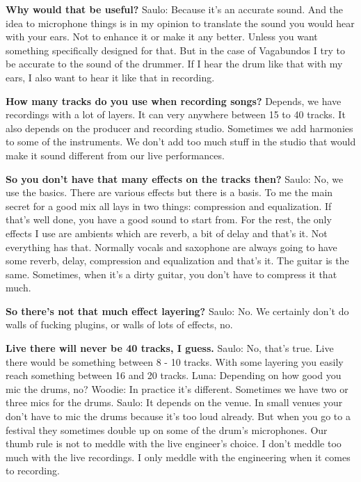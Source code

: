 \textbf{Why would that be useful?}
\newline Saulo: Because it's an accurate sound. And the idea to microphone things is in my opinion to translate the sound you would hear with your ears. Not to enhance it or make it any better.
Unless you want something specifically designed for that. But in the case of Vagabundos I try to be accurate to the sound of the drummer. If I hear the drum like that with my ears,
I also want to hear it like that in recording.

\textbf{How many tracks do you use when recording songs?}
Depends, we have recordings with a lot of layers. It can very anywhere between 15 to 40 tracks. It also depends on the producer and recording studio. Sometimes we add harmonies to some of the instruments.
We don't add too much stuff in the studio that would make it sound different from our live performances.

\textbf{So you don't have that many effects on the tracks then?}
\newline Saulo: No, we use the basics. There are various effects but there is a basis. To me the main secret for a good mix all lays in two things: compression and equalization.
If that's well done, you have a good sound to start from. For the rest, the only effects I use are ambients which are reverb, a bit of delay and that's it.
Not everything has that. Normally vocals and saxophone are always going to have some reverb, delay, compression and equalization and that's it.
The guitar is the same. Sometimes, when it's a dirty guitar, you don't have to compress it that much.

\textbf{So there's not that much effect layering?}
\newline Saulo: No. We certainly don't do walls of fucking plugins, or walls of lots of effects, no.

\textbf{Live there will never be 40 tracks, I guess.}
\newline Saulo: No, that's true. Live there would be something between 8 - 10 tracks. With some layering you easily reach something between 16 and 20 tracks.
\newline Luna: Depending on how good you mic the drums, no?
\newline Woodie: In practice it's different. Sometimes we have two or three mics for the drums.
\newline Saulo: It depends on the venue. In small venues your don't have to mic the drums because it's too loud already. But when you go to a festival they sometimes double up on some of the drum's microphones.
Our thumb rule is not to meddle with the live engineer's choice. I don't meddle too much with the live recordings. I only meddle with the engineering when it comes to recording.

